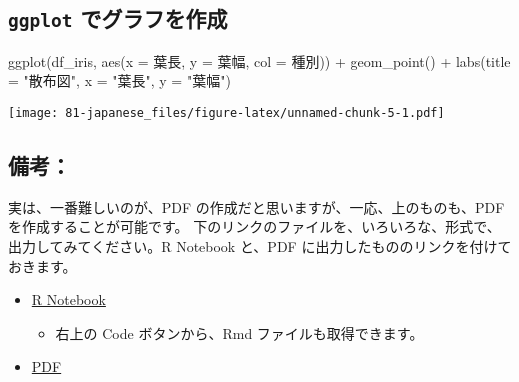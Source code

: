 \documentclass[
]{bxjsbook}
\newenvironment{Shaded}{\begin{snugshade}}{\end{snugshade}}
\newcommand{\AttributeTok}[1]{\textcolor[rgb]{0.77,0.63,0.00}{#1}}
\newcommand{\FunctionTok}[1]{\textcolor[rgb]{0.00,0.00,0.00}{#1}}
\newcommand{\NormalTok}[1]{#1}
\newcommand{\SpecialCharTok}[1]{\textcolor[rgb]{0.00,0.00,0.00}{#1}}
\newcommand{\StringTok}[1]{\textcolor[rgb]{0.31,0.60,0.02}{#1}}
\providecommand{\tightlist}{%
  \setlength{\itemsep}{0pt}\setlength{\parskip}{0pt}}
\theoremstyle{definition}
\theoremstyle{definition}
\theoremstyle{definition}
\theoremstyle{definition}
\theoremstyle{remark}
\begin{document}
\hypertarget{ggplot-ux3067ux30b0ux30e9ux30d5ux3092ux4f5cux6210}{%
\subsection{\texorpdfstring{\texttt{ggplot} でグラフを作成}{ggplot でグラフを作成}}\label{ggplot-ux3067ux30b0ux30e9ux30d5ux3092ux4f5cux6210}}

\begin{Shaded}
\begin{Highlighting}[]
\FunctionTok{ggplot}\NormalTok{(df\_iris, }\FunctionTok{aes}\NormalTok{(}\AttributeTok{x =} \StringTok{\textasciigrave{}}\AttributeTok{葉長}\StringTok{\textasciigrave{}}\NormalTok{, }\AttributeTok{y =} \StringTok{\textasciigrave{}}\AttributeTok{葉幅}\StringTok{\textasciigrave{}}\NormalTok{, }\AttributeTok{col =} \StringTok{\textasciigrave{}}\AttributeTok{種別}\StringTok{\textasciigrave{}}\NormalTok{)) }\SpecialCharTok{+}
  \FunctionTok{geom\_point}\NormalTok{() }\SpecialCharTok{+} \FunctionTok{labs}\NormalTok{(}\AttributeTok{title =} \StringTok{"散布図"}\NormalTok{, }\AttributeTok{x =} \StringTok{"葉長"}\NormalTok{, }\AttributeTok{y =} \StringTok{"葉幅"}\NormalTok{)}
\end{Highlighting}
\end{Shaded}

\texttt{[image: 81-japanese\_files/figure-latex/unnamed-chunk-5-1.pdf]}

\hypertarget{ux5099ux8003-1}{%
\subsection{備考：}\label{ux5099ux8003-1}}

実は、一番難しいのが、PDF の作成だと思いますが、一応、上のものも、PDF を作成することが可能です。
下のリンクのファイルを、いろいろな、形式で、出力してみてください。R Notebook と、PDF に出力したもののリンクを付けておきます。

\begin{itemize}
\tightlist
\item
  \href{https://ds-sl.github.io/intro2r/Rmarkdown-J.nb.html}{R Notebook}

  \begin{itemize}
  \tightlist
  \item
    右上の Code ボタンから、Rmd ファイルも取得できます。
  \end{itemize}
\item
  \href{https://ds-sl.github.io/intro2r/Rmarkdown-J.pdf}{PDF}
\end{itemize}
\end{document}
